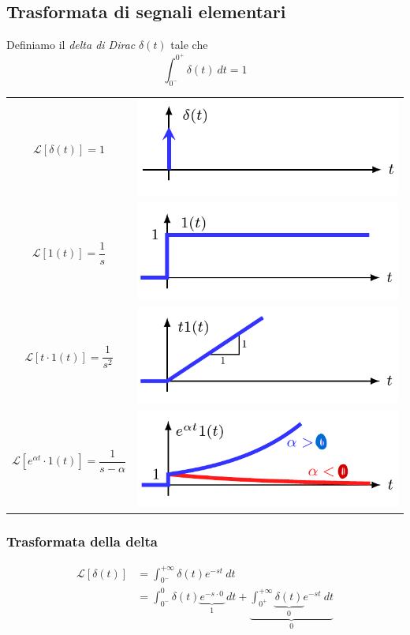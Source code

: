\documentclass{article}
\numberwithin{equation}{subsection}
\let\oldsubsection\subsection%
\renewcommand{\subsection}{%
  \renewcommand{\theequation}{\thesubsection.\arabic{equation}}%
  \oldsubsection}%
\begin{document}
\subsection{Trasformata di segnali elementari}
Definiamo il \textit{delta di Dirac} $\delta(t)$ tale che
\begin{equation}
    \int_{0^-}^{0^+} \delta(t) \ dt = 1
\end{equation}
\begin{center}
    \renewcommand{\arraystretch}{5}
    \begin{tabular}{c c}
        $\mathcal{L}[\delta(t)]=1$ & 
        \includegraphics[width=0.25\linewidth, valign=c]{Images/Delta.png}
        \\
        $\mathcal{L}[1(t)]=\dfrac{1}{s}$ & 
        \includegraphics[width=0.25\linewidth, valign=c]{Images/Scalino.png}
        \\
        $\mathcal{L}[t \cdot 1(t)]=\dfrac{1}{s^2}$ & 
        \includegraphics[width=0.25\linewidth, valign=c]{Images/Scalino_2.png}
        \\
        $\mathcal{L}[e^{\alpha t} \cdot 1(t)]=\dfrac{1}{s-\alpha}$ & 
        \includegraphics[width=0.25\linewidth, valign=c]{Images/Scalino_3.png}\\
    \end{tabular}
\end{center}

\subsubsection{Trasformata della delta}
\begin{align*}
    \mathcal{L}[\delta(t)] &= \int_{0^-}^{+\infty} \delta(t) e^{-st} \ dt \\
    &= \int_{0^-}^0 \delta(t) \underbrace{e^{-s\cdot 0}}_{1} \ dt + \underbrace{\int_{0^+}^{+\infty} \underbrace{\delta(t)}_{0} e^{-st} \ dt}_{0} \\
\end{align*}
\end{document}
